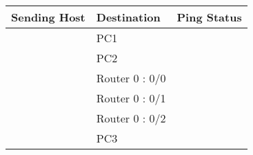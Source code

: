 \documentclass[a4paper,11pt]{article}
\begin{document}
\begin{enumerate}
\begin{table}[H]
              \begin{tabular}{| m{10em}| m{10em}| m{10em} |}
                  \hline
                  \multicolumn{1}{|l|}{\textbf{Sending Host}}                          & \textbf{Destination} & \multicolumn{1}{l|}{\textbf{Ping Status}}                                  \\
                  \hline
                  {\cellcolor[rgb]{0.141,0.525,1}}                                     & PC1                  & {\cellcolor[rgb]{0.42,0.988,0.827}}                                        \\
                  \hhline{|>{\arrayrulecolor[rgb]{0.141,0.525,1}}->{\arrayrulecolor{black}}->{\arrayrulecolor[rgb]{0.42,0.988,0.827}}->{\arrayrulecolor{black}}|}
                  {\cellcolor[rgb]{0.141,0.525,1}}                                     & PC2                  & {\cellcolor[rgb]{0.42,0.988,0.827}}                                        \\
                  \hhline{|>{\arrayrulecolor[rgb]{0.141,0.525,1}}->{\arrayrulecolor{black}}->{\arrayrulecolor[rgb]{0.42,0.988,0.827}}->{\arrayrulecolor{black}}|}
                  {\cellcolor[rgb]{0.141,0.525,1}}                                     & Router 0 : 0/0       & {\cellcolor[rgb]{0.42,0.988,0.827}}                                        \\
                  \hhline{|>{\arrayrulecolor[rgb]{0.141,0.525,1}}->{\arrayrulecolor{black}}->{\arrayrulecolor[rgb]{0.42,0.988,0.827}}->{\arrayrulecolor{black}}|}
                  {\cellcolor[rgb]{0.141,0.525,1}}                                     & Router 0 : 0/1       & {\cellcolor[rgb]{0.42,0.988,0.827}}                                        \\
                  \hhline{|>{\arrayrulecolor[rgb]{0.141,0.525,1}}->{\arrayrulecolor{black}}->{\arrayrulecolor[rgb]{0.42,0.988,0.827}}->{\arrayrulecolor{black}}|}
                  {\cellcolor[rgb]{0.141,0.525,1}}                                     & Router 0 : 0/2       & {\cellcolor[rgb]{0.42,0.988,0.827}}                                        \\
                  \hhline{|>{\arrayrulecolor[rgb]{0.141,0.525,1}}->{\arrayrulecolor{black}}->{\arrayrulecolor[rgb]{0.42,0.988,0.827}}->{\arrayrulecolor{black}}|}
                  {\cellcolor[rgb]{0.141,0.525,1}}                                     & PC3                  & {\cellcolor[rgb]{0.42,0.988,0.827}}                                        \\

\end{tabular}
\end{table}
\end{enumerate}
\end{document}
